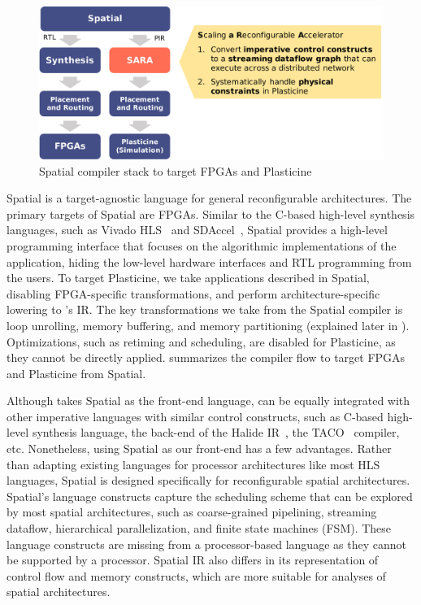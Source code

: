 \begin{figure}
\centering
\includegraphics[width=1\textwidth]{figs/spatialstack.pdf}
\caption[Spatial compiler stack to target FPGAs and Plasticine]{
  Spatial compiler stack to target FPGAs and Plasticine
}
\label{fig:spatialstack}
\end{figure}

Spatial is a target-agnostic language for general reconfigurable architectures. 
The primary targets of Spatial are FPGAs.
Similar to the C-based high-level synthesis languages, such as Vivado HLS~\cite{vivado} and
SDAccel~\cite{sdaccel},
Spatial provides a high-level programming interface that focuses on the algorithmic 
implementations of the application, hiding the low-level hardware interfaces and RTL programming from the
users.
To target Plasticine, we take applications described in Spatial, disabling FPGA-specific
transformations, and perform architecture-specific lowering to \name's IR.
The key transformations we take from the Spatial compiler is loop unrolling, memory buffering, and
memory partitioning
(explained later in ).
Optimizations, such as retiming and scheduling, are disabled for Plasticine, as they cannot be
directly applied.
 summarizes the compiler flow to target FPGAs and Plasticine from Spatial.

Although \name takes Spatial as the front-end language, \name can be equally
integrated with other imperative languages with similar control constructs, such as C-based high-level
synthesis language, the back-end of the Halide IR~\cite{halide}, the TACO~\cite{taco} compiler, etc.
Nonetheless, using Spatial as our front-end has a few advantages.
Rather than adapting existing languages for processor architectures like most HLS languages, 
Spatial is designed specifically for reconfigurable spatial architectures.
Spatial's language constructs capture the scheduling scheme that can be explored by most
spatial architectures, such as coarse-grained pipelining, streaming dataflow, hierarchical parallelization, 
and finite state machines (FSM).
These language constructs are missing from a processor-based language as they cannot be supported by
a processor.
Spatial IR also differs in its representation of control flow and memory constructs, which are more suitable for analyses of spatial architectures.

